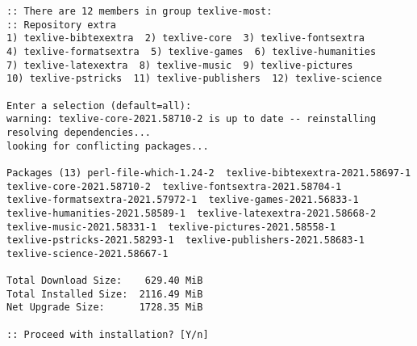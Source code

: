 \begin{lstlisting}[style=output]
:: There are 12 members in group texlive-most:
:: Repository extra
1) texlive-bibtexextra  2) texlive-core  3) texlive-fontsextra
4) texlive-formatsextra  5) texlive-games  6) texlive-humanities
7) texlive-latexextra  8) texlive-music  9) texlive-pictures
10) texlive-pstricks  11) texlive-publishers  12) texlive-science

Enter a selection (default=all): 
warning: texlive-core-2021.58710-2 is up to date -- reinstalling
resolving dependencies...
looking for conflicting packages...

Packages (13) perl-file-which-1.24-2  texlive-bibtexextra-2021.58697-1
texlive-core-2021.58710-2  texlive-fontsextra-2021.58704-1
texlive-formatsextra-2021.57972-1  texlive-games-2021.56833-1
texlive-humanities-2021.58589-1  texlive-latexextra-2021.58668-2
texlive-music-2021.58331-1  texlive-pictures-2021.58558-1
texlive-pstricks-2021.58293-1  texlive-publishers-2021.58683-1
texlive-science-2021.58667-1

Total Download Size:    629.40 MiB
Total Installed Size:  2116.49 MiB
Net Upgrade Size:      1728.35 MiB

:: Proceed with installation? [Y/n] 
\end{lstlisting}